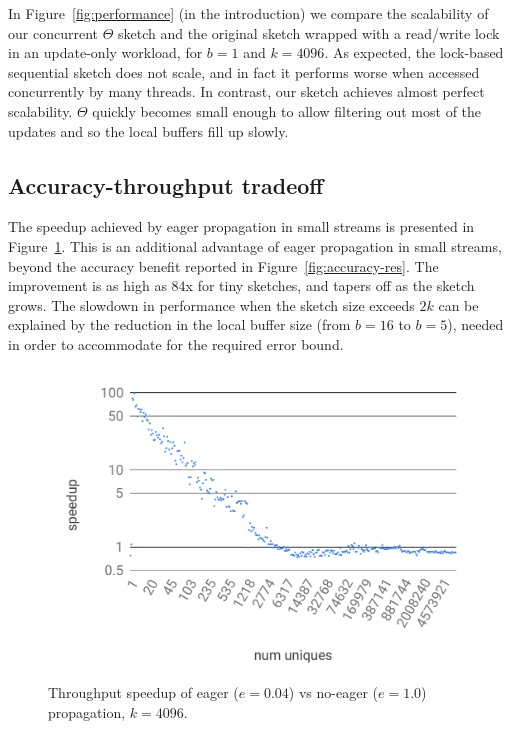In Figure~\ref{fig:performance} (in the introduction) we compare the scalability
of our concurrent $\Theta$ sketch and the original sketch wrapped
with a read/write lock in an update-only workload, for $b=1$ and $k=4096$.
As expected, the lock-based sequential sketch does not scale, and
in fact it performs worse when accessed concurrently by many threads.
In contrast, our sketch achieves almost perfect scalability.
$\Theta$ quickly becomes small enough to allow filtering out most of the updates and so the
local buffers fill up slowly.


\subsection{Accuracy-throughput tradeoff}
\label{ssec:tradeoffs}

The speedup achieved by eager propagation in small streams is presented in Figure~\ref{fig:speedup}.
This is an additional advantage of eager propagation in small streams, beyond the accuracy benefit reported in Figure~\ref{fig:accuracy-res}. 
The improvement is as high as $84$x for tiny sketches, and tapers off as the sketch grows.
The slowdown in performance when the sketch size exceeds $2k$ can be explained by the reduction
in the local buffer size (from $b=16$ to $b=5$), needed in order to accommodate for the required error bound.

\begin{figure}[tb]
\setlength{\abovecaptionskip}{0pt}
\setlength{\belowcaptionskip}{0pt}
\setlength\textfloatsep{0pt}
	\centering
	\includegraphics[width=\columnwidth]{images/eager-speedup.pdf}
	\caption{{Throughput speedup of eager ($e=0.04$) vs no-eager ($e=1.0$) propagation, $k = 4096$.}}
	\label{fig:speedup}
\end{figure}


